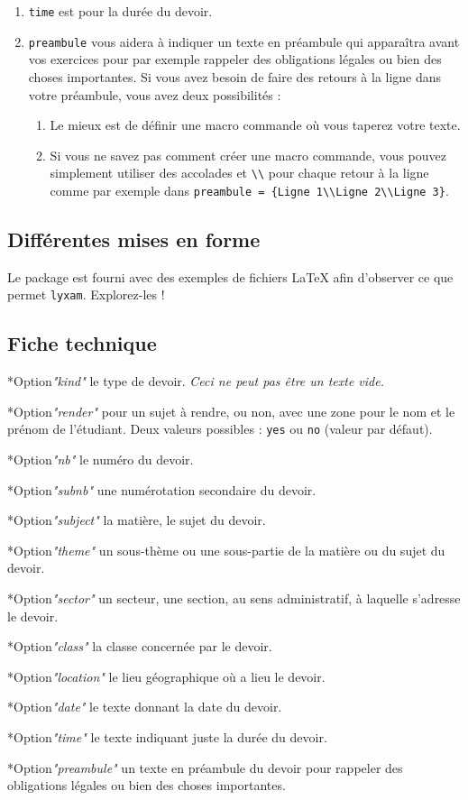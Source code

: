 \documentclass[12pt,a4paper]{article}
\makeatletter
\theoremstyle{definition}
\newcommand\IDmacro{\@ifstar{\@IDmacroStar}{\@IDmacroNoStar}}
\newcommand\@IDmacroNoStar[3]{%
        \texttt{%
        	\textbackslash#1%
        	\IfStrEq{#2}{0}{}{%
        		\,\,[#2 Option%
				\IfStrEq{#2}{1}{}{s}]%
			}%
    	    \IfStrEq{#3}{}{}{%
	    		\,\,(#3 Argument%
				\IfStrEq{#3}{1}{}{s})%
			}
	   	}
        \immediate\write\tempfile{macro@#1@#2@#3}%
    }
\newcommand\@IDmacroStar[2]{%
        \@IDmacroNoStar{#1}{0}{#2}%
    }
\newcommand\@IDoptarg{\@ifstar{\@IDoptargStar}{\@IDoptargNoStar}}
\newcommand\@IDoptargStar[2]{%
    	\vspace{0.5em}
		--- \texttt{#1%
			\IfStrEq{#2}{}{:}{\,#2:}%
		}%
	}
\newcommand\@IDoptargNoStar[2]{%
    	\IfStrEq{#2}{}{%
			\@IDoptargStar{#1}{}%
		}{%
			\@IDoptargStar{#1}{\##2}%
		}%
	}
\newcommand\IDkey[1]{%
    	\@IDoptarg*{Option}{{\itshape "#1"}}%
	}
\makeatother
\begin{document}
\begin{enumerate}
	\item \verb+time+ est pour la durée du devoir.

	\item \verb+preambule+ vous aidera à indiquer un texte en préambule qui apparaîtra avant vos exercices pour par exemple rappeler des obligations légales ou bien des choses importantes.
	 Si vous avez besoin de faire des retours à la ligne dans votre préambule, vous avez deux possibilités :

	 \begin{enumerate}
		\item Le mieux est de définir une macro commande où vous taperez votre texte.

		\item Si vous ne savez pas comment créer une macro commande, vous pouvez simplement utiliser des accolades et \verb+\\+ pour chaque retour à la ligne comme par exemple dans \verb+preambule = {Ligne 1\\Ligne 2\\Ligne 3}+.
	\end{enumerate}
\end{enumerate}


	\subsection{Différentes mises en forme}

Le package est fourni avec des exemples de fichiers \LaTeX{} afin d'observer ce que permet \verb+lyxam+. Explorez-les !


	\subsection{Fiche technique}

\IDmacro{exam}{12}{0}

\IDkey{kind} le type de devoir. \emph{Ceci ne peut pas être un texte vide.}

\IDkey{render} pour un sujet à rendre, ou non, avec une zone pour le nom et le prénom de l'étudiant. Deux valeurs possibles : \verb+yes+ ou \verb+no+ (valeur par défaut).

\IDkey{nb} le numéro du devoir.

\IDkey{subnb} une numérotation secondaire du devoir.

\IDkey{subject} la matière, le sujet du devoir.

\IDkey{theme} un sous-thème ou une sous-partie de la matière ou du sujet du devoir.

\IDkey{sector} un secteur, une section, au sens administratif, à laquelle s'adresse le devoir.

\IDkey{class} la classe concernée par le devoir.

\IDkey{location} le lieu géographique où a lieu le devoir.

\IDkey{date} le texte donnant la date du devoir.

\IDkey{time} le texte indiquant juste la durée du devoir.

\IDkey{preambule} un texte en préambule du devoir pour rappeler des obligations légales ou bien des choses importantes.
\end{document}
